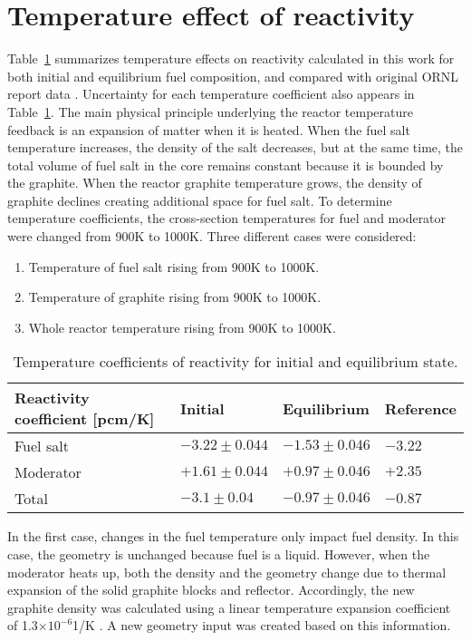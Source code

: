 \section{Temperature effect of reactivity}
Table~\ref{tab:tcoef} summarizes temperature effects on reactivity calculated in this work for both initial and equilibrium fuel composition, and compared with original \gls{ORNL} report data \cite{robertson_conceptual_1971}. Uncertainty for each temperature coefficient also appears in Table~\ref{tab:tcoef}. The main physical principle underlying the reactor temperature feedback is an expansion of matter when it is heated. When the fuel salt temperature increases, the density of the salt decreases, but at the same time, the total volume of fuel salt in the core remains constant because it is bounded by the graphite. When the reactor graphite temperature grows, the density of graphite declines creating additional space for fuel salt. To determine temperature coefficients, the cross-section temperatures for fuel and moderator were changed from 900K to 1000K. Three different cases were considered:
\begin{enumerate}
  \item Temperature of fuel salt rising from 900K to 1000K.
  \item Temperature of graphite rising from 900K to 1000K.
  \item Whole reactor temperature rising from 900K to 1000K.
\end{enumerate}

\begin{table}[ht!]
  \centering
  \caption{Temperature coefficients of reactivity for initial and equilibrium state.}
\begin{tabular}{| m{} | m{} | m{} | m{} |} \hline
   Reactivity coefficient [pcm/K]  & Initial      & Equilibrium  & Reference \cite{robertson_conceptual_1971} \\ [5pt]\hline   
Fuel salt        & $-3.22\pm0.044$ & $-1.53\pm0.046$ & $-3.22$  \\ [3pt] \hline
Moderator        & $+1.61\pm0.044$ & $+0.97\pm0.046$ & $+2.35$  \\ [3pt] \hline
Total            & $-3.1\pm0.04$   & $-0.97\pm0.046$ & $-0.87$  \\ [3pt] \hline
\end{tabular}
  \label{tab:tcoef}
\end{table}
In the first case, changes in the fuel temperature only impact fuel density. In this case, the geometry is unchanged because fuel is a liquid. However, when the moderator heats up, both the density and the geometry change due to thermal 
expansion of the solid graphite blocks and reflector. Accordingly, the new graphite density was calculated using a linear temperature expansion coefficient of 1.3$\times10^{-6}$1/K \cite{robertson_conceptual_1971}. A new geometry input was created based on this information.

